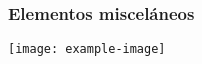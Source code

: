 \subsubsection{Elementos misceláneos}

\lipsum[1]

\lipsum[1]
\texttt{[image: example-image]}
\lipsum[1]